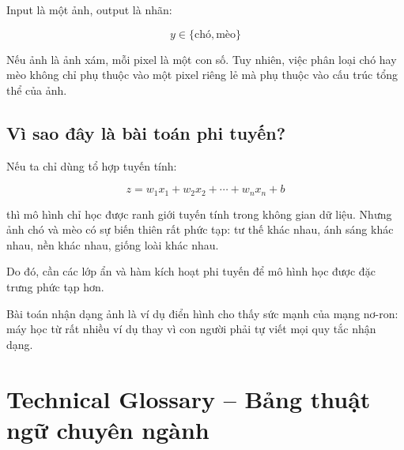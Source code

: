 Input là một ảnh, output là nhãn:

\[
    y \in \{\text{chó}, \text{mèo}\}
\]

Nếu ảnh là ảnh xám, mỗi pixel là một con số. Tuy nhiên, việc phân loại chó hay mèo không chỉ phụ thuộc vào một pixel riêng lẻ mà phụ thuộc vào cấu trúc tổng thể của ảnh.

\subsection{Vì sao đây là bài toán phi tuyến?}

Nếu ta chỉ dùng tổ hợp tuyến tính:

\[
    z = w_1x_1 + w_2x_2 + \cdots + w_nx_n + b
\]

thì mô hình chỉ học được ranh giới tuyến tính trong không gian dữ liệu. Nhưng ảnh chó và mèo có sự biến thiên rất phức tạp: tư thế khác nhau, ánh sáng khác nhau, nền khác nhau, giống loài khác nhau.

Do đó, cần các lớp ẩn và hàm kích hoạt phi tuyến để mô hình học được đặc trưng phức tạp hơn.

\begin{ghinho}
Bài toán nhận dạng ảnh là ví dụ điển hình cho thấy sức mạnh của mạng nơ-ron: máy học từ rất nhiều ví dụ thay vì con người phải tự viết mọi quy tắc nhận dạng.
\end{ghinho}

\section{Technical Glossary -- Bảng thuật ngữ chuyên ngành}

